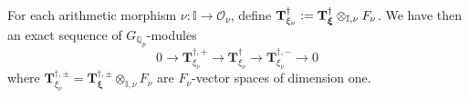 \documentclass[a4paper,11pt]{amsart}
\numberwithin{equation}{section}
\theoremstyle{plain}
\theoremstyle{definition}
\theoremstyle{remark}
\newcommand{\Q}{\mathbb Q}
\newcommand{\I}{\mathbb{I}}
\newcommand{\defeq}{\vcentcolon=}
\newcommand{\cyc}{{\mathrm{cyc}}}
\begin{document}

For each arithmetic morphism $\nu\colon \I\rightarrow\mathcal{O}_\nu$, define $\mathbf{T}^\dagger_{\xi_\nu}\defeq\mathbf{T}^\dagger_{\boldsymbol{\xi}}\otimes_{\I,\nu}F_{\nu}$. We have then an exact sequence of $G_{\Q_p}$-modules 
\[0\longrightarrow \mathbf{T}^{\dagger,+}_{\xi_\nu}\longrightarrow \mathbf{T}^\dagger_{\xi_\nu}\longrightarrow \mathbf{T}^{\dagger,-}_{\xi_\nu}\longrightarrow 0\] where $\mathbf{T}^{\dagger,\pm}_{\xi_\nu}=\mathbf{T}^{\dagger,\pm}_{\boldsymbol{\xi}}\otimes_{\I,\nu}F_\nu$  
are $F_\nu$-vector spaces of dimension one. 
\end{document}
